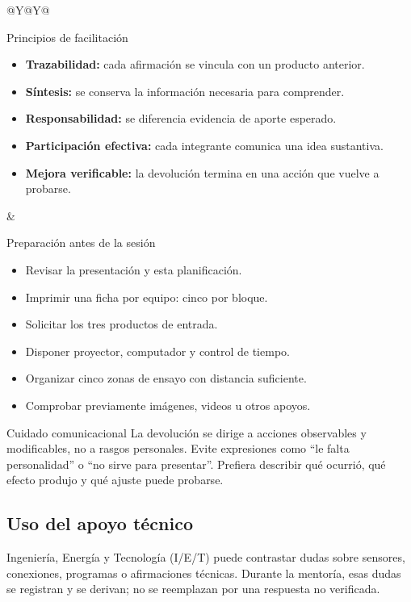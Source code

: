 \documentclass[10pt,a4paper]{article}
\begin{document}
\begin{tabularx}{\textwidth}{@{}Y@{\hspace{5mm}}Y@{}}
\begin{docbox}[height=76mm]{Principios de facilitación}
\begin{itemize}
  \item \textbf{Trazabilidad:} cada afirmación se vincula con un producto anterior.
  \item \textbf{Síntesis:} se conserva la información necesaria para comprender.
  \item \textbf{Responsabilidad:} se diferencia evidencia de aporte esperado.
  \item \textbf{Participación efectiva:} cada integrante comunica una idea sustantiva.
  \item \textbf{Mejora verificable:} la devolución termina en una acción que vuelve a probarse.
\end{itemize}
\end{docbox}
&
\begin{docbox}[height=76mm]{Preparación antes de la sesión}
\begin{itemize}
  \item Revisar la presentación y esta planificación.
  \item Imprimir una ficha por equipo: cinco por bloque.
  \item Solicitar los tres productos de entrada.
  \item Disponer proyector, computador y control de tiempo.
  \item Organizar cinco zonas de ensayo con distancia suficiente.
  \item Comprobar previamente imágenes, videos u otros apoyos.
\end{itemize}
\end{docbox}
\end{tabularx}

\begin{accentbox}{Cuidado comunicacional}
La devolución se dirige a acciones observables y modificables, no a rasgos personales. Evite expresiones como ``le falta personalidad'' o ``no sirve para presentar''. Prefiera describir qué ocurrió, qué efecto produjo y qué ajuste puede probarse.
\end{accentbox}

\subsection{Uso del apoyo técnico}
Ingeniería, Energía y Tecnología (I/E/T) puede contrastar dudas sobre sensores, conexiones, programas o afirmaciones técnicas. Durante la mentoría, esas dudas se registran y se derivan; no se reemplazan por una respuesta no verificada.
\end{document}
